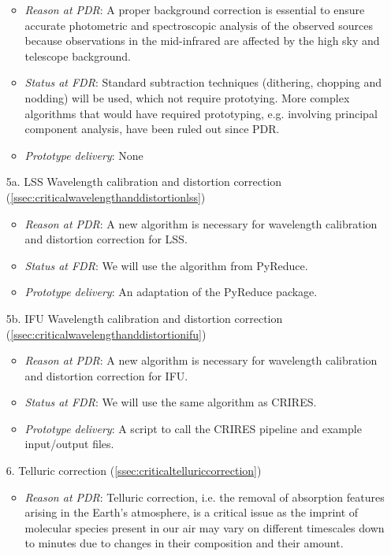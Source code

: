 \begin{enumerate}
\begin{itemize}
        \item \textit{Reason at PDR}: A proper background correction is essential to ensure accurate photometric and spectroscopic analysis of the observed sources because observations in the mid-infrared are affected by the high sky and telescope background.
        \item \textit{Status at FDR}: Standard subtraction techniques (dithering, chopping and nodding) will be used, which not require prototying. More complex algorithms that would have required prototyping, e.g.
involving principal component analysis, have been ruled out since PDR.
        \item \textit{Prototype delivery}: None
    \end{itemize}
    \item[5a.] LSS Wavelength calibration and distortion correction (\ref{ssec:criticalwavelengthanddistortionlss})
    \begin{itemize}
        \item \textit{Reason at PDR}: A new algorithm is necessary for wavelength calibration and distortion correction for LSS.
        \item \textit{Status at FDR}: We will use the algorithm from PyReduce.
        \item \textit{Prototype delivery}: An adaptation of the PyReduce package.
    \end{itemize}
    \item[5b.] \ac{IFU} Wavelength calibration and distortion correction (\ref{ssec:criticalwavelengthanddistortionifu})
    \begin{itemize}
        \item \textit{Reason at PDR}: A new algorithm is necessary for wavelength calibration and distortion correction for IFU.
        \item \textit{Status at FDR}: We will use the same algorithm as CRIRES.
        \item \textit{Prototype delivery}: A script to call the CRIRES pipeline and example input/output files.
    \end{itemize}
    \item[6.] Telluric correction (\ref{ssec:criticaltelluriccorrection})
    \begin{itemize}
        \item \textit{Reason at PDR}: Telluric correction, i.e. the removal of absorption features arising in the Earth’s atmosphere, is a critical issue as the imprint of molecular species present in our air may vary on different timescales down to minutes due to changes in their composition and their amount.

\end{itemize}
\end{enumerate}
